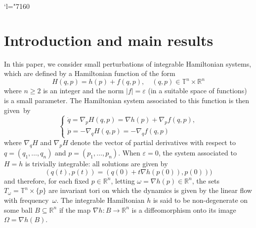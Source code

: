 \documentclass[JEP,XML,SOM,Unicode]{cedram}
\newcommand{\Changel}{\mathcode`l="7160}
\numberwithin{equation}{section}
\theoremstyle{plain}
\theoremstyle{definition}
\newcommand{\R}{\mathbb{R}}
\newcommand\T{\mathbb T}
\begin{document}
\maketitle
\tableofcontents
\mainmatter

\Changel
\section{Introduction and main results}\label{s1}

In this paper, we consider small perturbations of integrable Hamiltonian systems, which are defined by a Hamiltonian function of the form
\[ H(q,p)=h(p)+f(q,p), \quad (q,p) \in \T^{n} \times \R^n \]
where $n\geq 2$ is an integer and the norm $|f|=\varepsilon$ (in a suitable space of functions) is a small parameter. The Hamiltonian system associated to this function is then given~by
\begin{equation*}
\begin{cases}
\dot{q}=\nabla_p H(q,p)=\nabla h (p)+ \nabla_p f(q,p),\\
\dot{p}=-\nabla_q H(q,p)=-\nabla_q f(q,p)
\end{cases}
\end{equation*}
where $\nabla_q H$ and $\nabla_p H$ denote the vector of partial derivatives with respect to $q=(q_1,\dots,q_n)$ and $p=(p_1,\dots,p_n)$. When $\varepsilon=0$, the system associated to $H=h$ is trivially integrable: all solutions are given by
\[ (q(t),p(t))=(q(0)+t \nabla h (p(0)),p(0))) \]
and therefore, for each fixed $p \in \R^n$, letting $\omega=\nabla h(p) \in \R^n$, the sets $T_{\omega}=\T^n \times \{p\}$ are invariant tori on which the dynamics is given by the linear flow with frequency~$\omega$. The integrable Hamiltonian $h$ is said to be non-degenerate on some ball $B \subseteq \R^n$ if the map $\nabla h : B \to \R^n$ is a diffeomorphism onto its image $\Omega=\nabla h(B)$.
\end{document}
